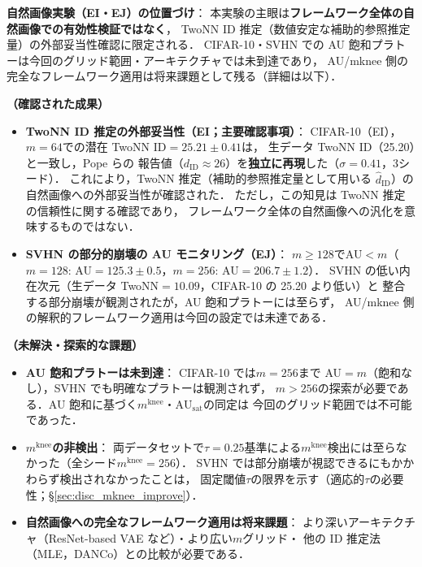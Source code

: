 \documentclass[11pt,a4paper]{jsarticle}
\newcommand{\AUsat}{\mathrm{AU}_{\mathrm{sat}}}
\newcommand{\mknee}{m^{\mathrm{knee}}}
\begin{document}
\textbf{自然画像実験（EI・EJ）の位置づけ}：
本実験の主眼は\textbf{フレームワーク全体の自然画像での有効性検証ではなく}，
TwoNN ID 推定（数値安定な補助的参照推定量）の外部妥当性確認に限定される．
CIFAR-10・SVHN での AU 飽和プラトーは今回のグリッド範囲・アーキテクチャでは未到達であり，
AU/mknee 側の完全なフレームワーク適用は将来課題として残る（詳細は以下）．

\textbf{（確認された成果）}
\begin{itemize}
  \item \textbf{TwoNN ID 推定の外部妥当性（EI；主要確認事項）}：
        CIFAR-10（EI），$m=64$での潜在 TwoNN ID$=25.21\pm0.41$は，
        生データ TwoNN ID（25.20）と一致し，Pope ら\cite{pope2021intrinsic}の
        報告値（$d_\mathrm{ID} \approx 26$）を\textbf{独立に再現}した（$\sigma=0.41$，3シード）．
        これにより，TwoNN 推定（補助的参照推定量として用いる $\hat{d}_\mathrm{ID}$）の
        自然画像への外部妥当性が確認された．
        ただし，この知見は TwoNN 推定の信頼性に関する確認であり，
        フレームワーク全体の自然画像への汎化を意味するものではない．
  \item \textbf{SVHN の部分的崩壊の AU モニタリング（EJ）}：
        $m \geq 128$でAU$< m$（$m=128$: AU$=125.3\pm0.5$，$m=256$: AU$=206.7\pm1.2$）．
        SVHN の低い内在次元（生データ TwoNN$=10.09$，CIFAR-10 の 25.20 より低い）と
        整合する部分崩壊が観測されたが，AU 飽和プラトーには至らず，
        AU/mknee 側の解釈的フレームワーク適用は今回の設定では未達である．
\end{itemize}

\textbf{（未解決・探索的な課題）}
\begin{itemize}
  \item \textbf{AU 飽和プラトーは未到達}：
        CIFAR-10 では$m=256$まで AU$=m$（飽和なし），SVHN でも明確なプラトーは観測されず，
        $m > 256$の探索が必要である．AU 飽和に基づく$\mknee$・$\AUsat$の同定は
        今回のグリッド範囲では不可能であった．
  \item \textbf{$\mknee$の非検出}：
        両データセットで$\tau = 0.25$基準による$\mknee$検出には至らなかった（全シード$\mknee=256$）．
        SVHN では部分崩壊が視認できるにもかかわらず検出されなかったことは，
        固定閾値$\tau$の限界を示す（適応的$\tau$の必要性；§\ref{sec:disc_mknee_improve}）．
  \item \textbf{自然画像への完全なフレームワーク適用は将来課題}：
        より深いアーキテクチャ（ResNet-based VAE など）・より広い$m$グリッド・
        他の ID 推定法（MLE，DANCo）との比較が必要である．
\end{itemize}
\end{document}
